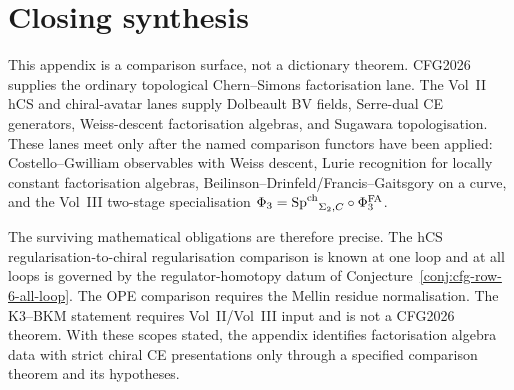 \section{Closing synthesis}
\label{sec:cfg-closing}

This appendix is a comparison surface, not a dictionary theorem. CFG2026
supplies the ordinary topological Chern--Simons factorisation lane. The
Vol~II hCS and chiral-avatar lanes supply Dolbeault BV fields,
Serre-dual CE generators, Weiss-descent factorisation algebras, and
Sugawara topologisation. These lanes meet only after the named
comparison functors have been applied: Costello--Gwilliam observables
with Weiss descent, Lurie recognition for locally constant
factorisation algebras, Beilinson--Drinfeld/Francis--Gaitsgory on a
curve, and the Vol~III two-stage specialisation
$\Phi_3={\mathrm{Sp}^{\mathrm{ch}}}_{\Sigma_2,C}\circ\Phi^{\mathrm{FA}}_3$.

The surviving mathematical obligations are therefore precise. The hCS
regularisation-to-chiral regularisation comparison is known at one loop
and at all loops is governed by the regulator-homotopy datum of
Conjecture~\ref{conj:cfg-row-6-all-loop}. The OPE comparison requires
the Mellin residue normalisation. The K3--BKM statement requires
Vol~II/Vol~III input and is not a CFG2026 theorem. With these scopes
stated, the appendix identifies factorisation algebra data with strict
chiral CE presentations only through a specified comparison theorem and
its hypotheses.
